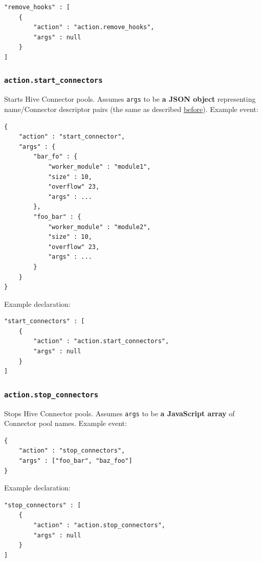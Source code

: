 \documentclass[a4paper]{article}
\begin{document}
\begin{verbatim}
"remove_hooks" : [
    {
        "action" : "action.remove_hooks",
        "args" : null
    }
]
\end{verbatim}
\subsubsection{\texttt{action.start\_connectors}}
\label{sec-9-3-8}

Starts Hive Connector pools. Assumes \texttt{args} to be \textbf{a JSON object} representing name/Connector descriptor pairs (the same as described \hyperref[ref-connectors_config]{before}). Example event:


\begin{verbatim}
{
    "action" : "start_connector",
    "args" : {
        "bar_fo" : {
            "worker_module" : "module1",
            "size" : 10,
            "overflow" 23,
            "args" : ...
        },
        "foo_bar" : {
            "worker_module" : "module2",
            "size" : 10,
            "overflow" 23,
            "args" : ...
        }
    }
}
\end{verbatim}




\noindent
Example declaration:

\begin{verbatim}
"start_connectors" : [
    {
        "action" : "action.start_connectors",
        "args" : null
    }
]
\end{verbatim}
\subsubsection{\texttt{action.stop\_connectors}}
\label{sec-9-3-9}

Stops Hive Connector pools. Assumes \texttt{args} to be \textbf{a JavaScript array} of Connector pool names. Example event:


\begin{verbatim}
{
    "action" : "stop_connectors",
    "args" : ["foo_bar", "baz_foo"]
}
\end{verbatim}




\noindent
Example declaration:

\begin{verbatim}
"stop_connectors" : [
    {
        "action" : "action.stop_connectors",
        "args" : null
    }
]
\end{verbatim}
\end{document}
